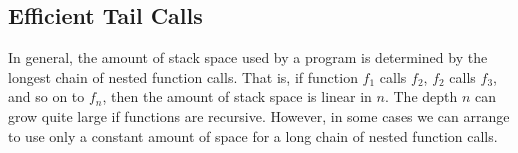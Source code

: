 \documentclass[7x10]{TimesAPriori_MIT}%
\numberwithin{theorem}{chapter}
\numberwithin{definition}{chapter}
\numberwithin{equation}{chapter}
\begin{document}


\subsection{Efficient Tail Calls}
\label{sec:tail-call}

In general, the amount of stack space used by a program is determined
by the longest chain of nested function calls. That is, if function
$f_1$ calls $f_2$, $f_2$ calls $f_3$, and so on to $f_n$, then the
amount of stack space is linear in $n$.  The depth $n$ can grow quite
large if functions are recursive. However, in some cases we can
arrange to use only a constant amount of space for a long chain of
nested function calls.
\end{document}
